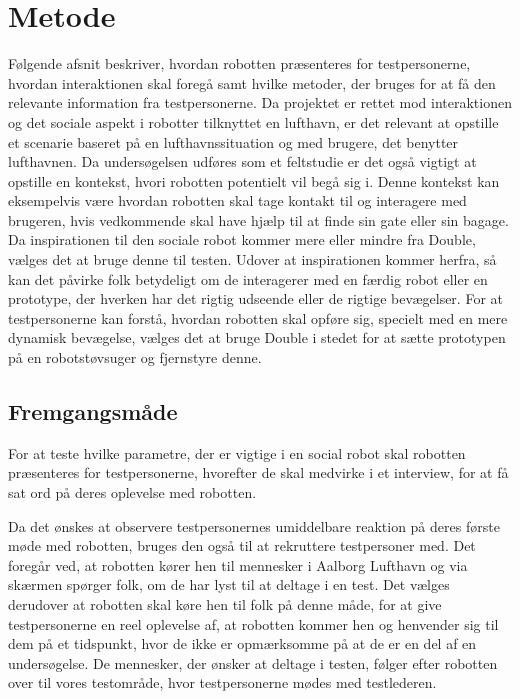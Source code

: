 \section{Metode}
\label{ParametreMetode}
%
Følgende afsnit beskriver, hvordan robotten præsenteres for testpersonerne, hvordan interaktionen skal foregå samt hvilke metoder, der bruges for at få den relevante information fra testpersonerne.\blankline
%
Da projektet er rettet mod interaktionen og det sociale aspekt i robotter tilknyttet en lufthavn, er det relevant at opstille et scenarie baseret på en lufthavnssituation og med brugere, det benytter lufthavnen. Da undersøgelsen udføres som et feltstudie er det også vigtigt at opstille en kontekst, hvori robotten potentielt vil begå sig i. Denne kontekst kan eksempelvis være hvordan robotten skal tage kontakt til og interagere med brugeren, hvis vedkommende skal have hjælp til at finde sin gate eller sin bagage.\blankline
%
Da inspirationen til den sociale robot kommer mere eller mindre fra Double, vælges det at bruge denne til testen. Udover at inspirationen kommer herfra, så kan det påvirke folk betydeligt om de interagerer med en færdig robot eller en prototype, der hverken har det rigtig udseende eller de rigtige bevægelser. For at testpersonerne kan forstå, hvordan robotten skal opføre sig, specielt med en mere dynamisk bevægelse, vælges det at bruge Double i stedet for at sætte prototypen på en robotstøvsuger og fjernstyre denne. 

\subsection{Fremgangsmåde}
\label{ParametreFremgangsmaade}
%
For at teste hvilke parametre, der er vigtige i en social robot skal robotten præsenteres for testpersonerne, hvorefter de skal medvirke i et interview, for at få sat ord på deres oplevelse med robotten. 

Da det ønskes at observere testpersonernes umiddelbare reaktion på deres første møde med robotten, bruges den også til at rekruttere testpersoner med. Det foregår ved, at robotten kører hen til mennesker i Aalborg Lufthavn og via skærmen spørger folk, om de har lyst til at deltage i en test. Det vælges derudover at robotten skal køre hen til folk på denne måde, for at give testpersonerne en reel oplevelse af, at robotten kommer hen og henvender sig til dem på et tidspunkt, hvor de ikke er opmærksomme på at de er en del af en undersøgelse. De mennesker, der ønsker at deltage i testen, følger efter robotten over til vores testområde, hvor testpersonerne mødes med testlederen.\blankline

